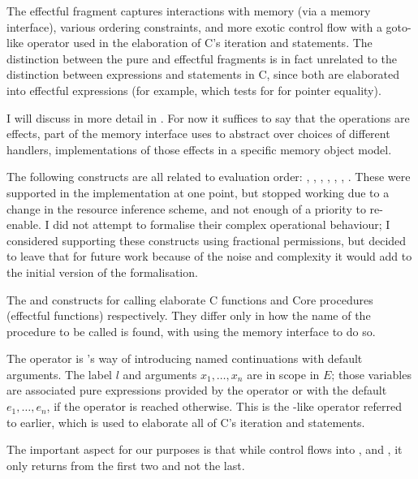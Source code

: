 The effectful fragment captures interactions with memory (via a memory
interface), various ordering constraints, and more exotic control flow with a
goto-like operator used in the elaboration of C's iteration and 
statements. The distinction between the pure and effectful fragments is in
fact unrelated to the distinction between expressions and statements in C,
since both are elaborated into effectful expressions (for example,
 which tests for for pointer equality).

I will discuss  in more detail in %
. For now it suffices to say that the
operations are effects, part of the memory interface  uses to abstract
over choices of different handlers, implementations of those effects in a
specific memory object model.

The following constructs are all related to evaluation order:
, , , %
, , , %
. These were supported in the implementation at one %
point, but stopped working due to a change
in the resource inference scheme, and not enough of a priority to re-enable. I
did not attempt to formalise their complex operational behaviour;
I considered supporting these constructs using fractional permissions,
but decided to leave that for future work because of the noise and complexity
it would add to the initial version of the formalisation.

The  and  constructs for calling %
elaborate C functions and Core procedures (effectful functions) respectively.
They differ only in how the name of the procedure to be called is found, with
 using the memory interface to do so. %

The  operator is 's way of introducing named %
continuations with default arguments. The label $l$ and arguments $x_1, \ldots,
x_n$ are in scope in $E$; those variables are associated pure expressions
provided by the  operator or with the default $e_1, \ldots, %
e_n$, if the operator is reached otherwise. This is the -like
operator referred to earlier, which is used to elaborate all of C's iteration
and  statements.

The important aspect for our purposes is that while control flows into
,  and , it %
only returns from the first two and not the last.

